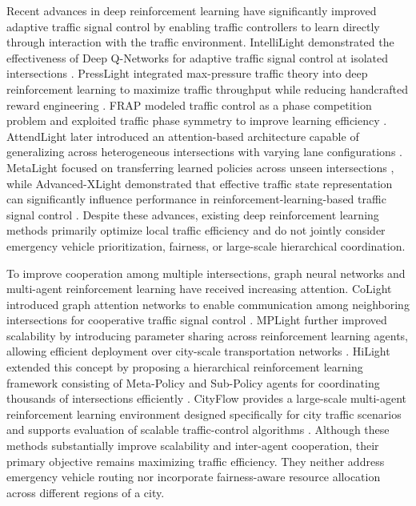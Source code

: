 \documentclass[3p,times]{elsarticle}
\theoremstyle{plain}
\theoremstyle{definition}
\begin{document}
Recent advances in deep reinforcement learning have significantly
improved adaptive traffic signal control by enabling traffic
controllers to learn directly through interaction with the traffic
environment. IntelliLight demonstrated the effectiveness of Deep
Q-Networks for adaptive traffic signal control at isolated
intersections \cite{intellight}. PressLight integrated max-pressure
traffic theory into deep reinforcement learning to maximize traffic
throughput while reducing handcrafted reward engineering
\cite{presslight}. FRAP modeled traffic control as a phase competition
problem and exploited traffic phase symmetry to improve learning
efficiency \cite{frap}. AttendLight later introduced an
attention-based architecture capable of generalizing across
heterogeneous intersections with varying lane configurations
\cite{attendlight}. MetaLight focused on transferring learned
policies across unseen intersections \cite{metalight}, while
Advanced-XLight demonstrated that effective traffic state
representation can significantly influence performance in
reinforcement-learning-based traffic signal control
\cite{advancedxlight}. Despite these advances, existing deep
reinforcement learning methods primarily optimize local traffic
efficiency and do not jointly consider emergency vehicle
prioritization, fairness, or large-scale hierarchical coordination.

To improve cooperation among multiple intersections, graph neural
networks and multi-agent reinforcement learning have received
increasing attention. CoLight introduced graph attention networks to
enable communication among neighboring intersections for cooperative
traffic signal control \cite{colight}. MPLight further improved
scalability by introducing parameter sharing across reinforcement
learning agents, allowing efficient deployment over city-scale
transportation networks \cite{mplight}. HiLight extended this concept
by proposing a hierarchical reinforcement learning framework
consisting of Meta-Policy and Sub-Policy agents for coordinating
thousands of intersections efficiently \cite{hilight}. CityFlow
provides a large-scale multi-agent reinforcement learning environment
designed specifically for city traffic scenarios and supports
evaluation of scalable traffic-control algorithms \cite{cityflow}.
Although these methods substantially improve scalability and
inter-agent cooperation, their primary objective remains maximizing
traffic efficiency. They neither address emergency vehicle routing
nor incorporate fairness-aware resource allocation across different
regions of a city.
\end{document}
